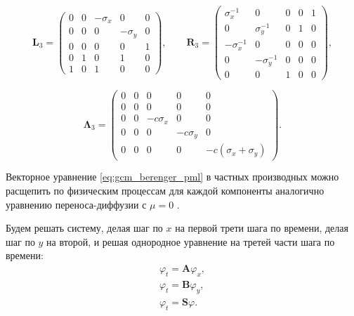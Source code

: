 \begin{equation*}
    \pmb{L}_3 = \begin{pmatrix}
        0 & 0 & -\sigma_x & 0 & 0 \\
        0 & 0 & 0 & -\sigma_y & 0 \\
        0 & 0 & 0 & 0 & 1 \\
        0 & 1 & 0 & 1 & 0 \\
        1 & 0 & 1 & 0 & 0
    \end{pmatrix} , \qquad
    \pmb{R}_3 = \begin{pmatrix}
        \sigma_x^{-1} & 0 & 0 & 0 & 1 \\
        0 & \sigma_y^{-1} & 0 & 1 & 0 \\
        -\sigma_x^{-1} & 0 & 0 & 0 & 0 \\
        0 & -\sigma_y^{-1} & 0 & 0 & 0 \\
        0 & 0 & 1 & 0 & 0
    \end{pmatrix} ,
\end{equation*}

\begin{equation*}
    \pmb{\Lambda}_3 = \begin{pmatrix}
        0 & 0 & 0 & 0 & 0 \\
        0 & 0 & 0 & 0 & 0 \\
        0 & 0 & -c \sigma_x & 0 & 0 \\
        0 & 0 & 0 & -c \sigma_y & 0 \\
        0 & 0 & 0 & 0 & -c (\sigma_x + \sigma_y)
    \end{pmatrix}.
\end{equation*}

Векторное уравнение \eqref{eq:gcm_berenger_pml} в частных производных можно расщепить по физическим процессам для каждой компоненты аналогично уравнению переноса-диффузии с $\mu = 0$ \cite{rashep_marchuk}.

Будем решать систему, делая шаг по $x$ на первой трети шага по времени, делая шаг по $y$ на второй, и решая однородное уравнение на третей части шага по времени:
\begin{gather*} 
	\label{eq:pml_eq_split_1} \varphi_t = \pmb{A} \varphi_x , \\
	\label{eq:pml_eq_split_2} \varphi_t = \pmb{B} \varphi_y , \\
	\label{eq:pml_eq_split_3} \varphi_t = \pmb{S} \varphi .
\end{gather*}

